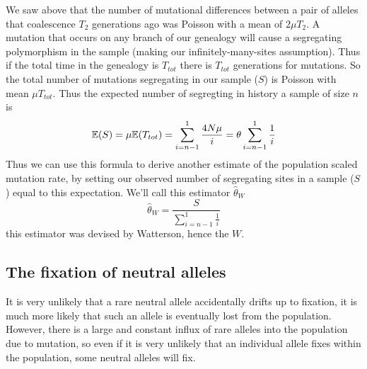 We saw above that the number of mutational differences between a pair
of alleles that coalescence $T_2$ generations ago was Poisson with a
mean of $2 \mu T_2$. A mutation that occurs on any branch of our
genealogy will cause a segregating polymorphism in the sample
(making our infinitely-many-sites assumption). Thus if the total time
in the genealogy is $T_{tot}$ there is $T_{tot}$
generations for mutations. So the total number of mutations
segregating in our sample ($S$) is Poisson with mean $\mu T_{tot}$. Thus the
expected number of segregting  in history a sample of size $n$ is
\begin{equation}
\mathbb{E}(S) = \mu \mathbb{E}(T_{tot}) = \sum_{i=n-1}^1 \frac{4N\mu }{i} = \theta
\sum_{i=n-1}^1 \frac{1}{i}
\end{equation}
Thus we can use this formula to derive another estimate of the
population scaled mutation rate, by setting our observed number of
segregating sites in a sample ($S$) equal to this expectation. We'll call this estimator $\widehat{\theta}_W$
\begin{equation}
\widehat{\theta}_W =\frac{ S}{\sum_{i=n-1}^1 \frac{1}{i}}  
\end{equation}
this estimator was devised by Watterson, hence the $W$.


\subsection{The fixation of neutral alleles}
It is very unlikely that a rare neutral allele accidentally drifts up
to fixation, it is much more likely that such an allele is eventually
lost from the population. However, there is a large and constant influx of
rare alleles into the population due to mutation, so even if it is very
unlikely that an individual allele fixes within the population, some
neutral alleles will fix.  \\




